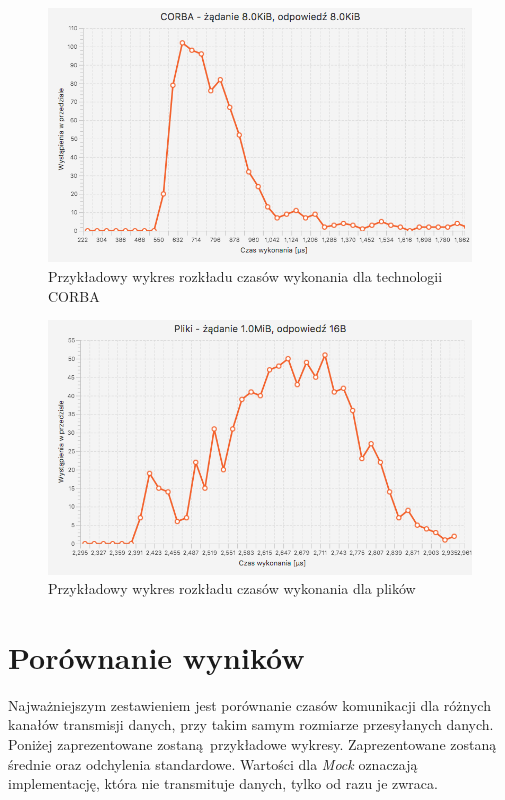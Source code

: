 \begin{figure}[H]
    \centering
    \includegraphics[scale=0.38]{img/charts/CORBA_chart_8192_8192.png}
    \caption{Przykładowy wykres rozkładu czasów wykonania dla technologii CORBA}
\end{figure}

\begin{figure}[H]
    \centering
    \includegraphics[scale=0.38]{img/charts/FILE_chart_1048576_16.png}
    \caption{Przykładowy wykres rozkładu czasów wykonania dla plików}
\end{figure}


\section{Porównanie wyników}

Najważniejszym zestawieniem jest porównanie czasów komunikacji dla różnych kanałów transmisji danych, przy takim samym rozmiarze przesyłanych danych. Poniżej zaprezentowane zostaną przykładowe wykresy. Zaprezentowane zostaną średnie oraz odchylenia standardowe. Wartości dla \textit{Mock} oznaczają implementację, która nie transmituje danych, tylko od razu je zwraca.


